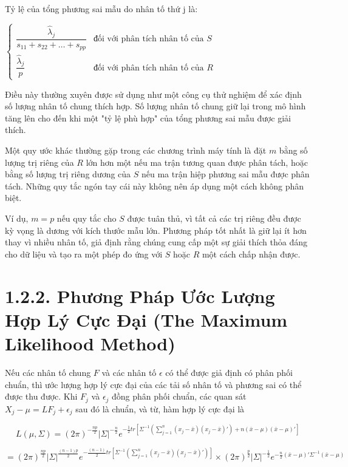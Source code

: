 \documentclass{article}
\begin{document}
Tỷ lệ của tổng phương sai mẫu do nhân tố thứ j là: 

\(\left\{
\begin{array}{ll}
\dfrac{\hat{\lambda}_j}{s_{11} + s_{22} + \ldots + s_{pp}} & \text{đối với phân tích nhân tố của } S \\
\dfrac{\hat{\lambda}_j}{p} & \text{đối với phân tích nhân tố của } R
\end{array}
\right.\)


Điều này thường xuyên được sử dụng như một công cụ thử nghiệm để xác định số lượng nhân tố chung thích hợp. Số lượng nhân tố chung giữ lại trong mô hình tăng lên cho đến khi một "tỷ lệ phù hợp" của tổng phương sai mẫu được giải thích.

Một quy ước khác thường gặp trong các chương trình máy tính là đặt \( m \) bằng số lượng trị riêng của \( R \) lớn hơn một nếu ma trận tương quan được phân tách, hoặc bằng số lượng trị riêng dương của \( S \) nếu ma trận hiệp phương sai mẫu được phân tách. Những quy tắc ngón tay cái này không nên áp dụng một cách không phân biệt.

Ví dụ, \( m = p \) nếu quy tắc cho \( S \) được tuân thủ, vì tất cả các trị riêng đều được kỳ vọng là dương với kích thước mẫu lớn. Phương pháp tốt nhất là giữ lại ít hơn thay vì nhiều nhân tố, giả định rằng chúng cung cấp một sự giải thích thỏa đáng cho dữ liệu và tạo ra một phép đo ứng với \( S \) hoặc \( R \) một cách chấp nhận được.


\section*{1.2.2. Phương Pháp Ước Lượng Hợp Lý Cực Đại (The Maximum Likelihood Method)}

Nếu các nhân tố chung \( F \) và các nhân tố  \( \epsilon \) có thể được giả định có phân phối chuẩn, thì ước lượng hợp lý cực đại của các tải số nhân tố và phương sai có thể được thu được. Khi \( F_j \) và \( \epsilon_j \) đồng phân phối chuẩn, các quan sát \( X_j - \mu = LF_j + \epsilon_j \) sau đó là chuẩn, và từ, hàm hợp lý cực đại là

\begin{equation}
L(\mu, \Sigma) = (2\pi)^{-\frac{np}{2}}|\Sigma|^{-\frac{n}{2}}e^{-\frac{1}{2}tr\left[\Sigma^{-1}\left(\sum_{j=1}^{n}(x_j-\bar{x})(x_j-\bar{x})'\right) + n(\bar{x} - \mu)(\bar{x} - \mu)'\right]}
\end{equation}

\begin{equation}
= (2\pi)^{\frac{np}{2}}|\Sigma|^{\frac{(n-1)p}{2}}e^{-\frac{(n-1)}{2}tr\left[\Sigma^{-1}\left(\sum_{j=1}^{n}(x_j-\bar{x})(x_j-\bar{x})'\right)\right]}
\times (2\pi)^{\frac{p}{2}}|\Sigma|^{-\frac{1}{2}}e^{-\frac{n}{2}(\bar{x}-\mu)'\Sigma^{-1}(\bar{x}-\mu)}
\end{equation}
\end{document}
